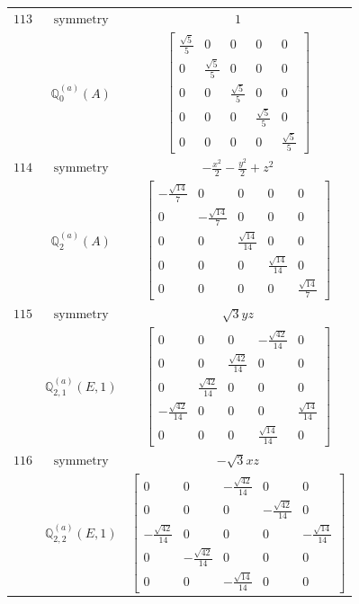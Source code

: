 \documentclass[fleqn,8pt,landscape]{jsarticle}
\begin{document}
\begin{longtable}{ccc}
$ 113 $ & $ \text{symmetry} $ & $ 1 $ \\
$  $ & $ \mathbb{Q}_{0}^{(a)}(A) $ & $ \begin{bmatrix} \frac{\sqrt{5}}{5} & 0 & 0 & 0 & 0 \\ 0 & \frac{\sqrt{5}}{5} & 0 & 0 & 0 \\ 0 & 0 & \frac{\sqrt{5}}{5} & 0 & 0 \\ 0 & 0 & 0 & \frac{\sqrt{5}}{5} & 0 \\ 0 & 0 & 0 & 0 & \frac{\sqrt{5}}{5} \end{bmatrix} $ \\ \hline
$ 114 $ & $ \text{symmetry} $ & $ - \frac{x^{2}}{2} - \frac{y^{2}}{2} + z^{2} $ \\
$  $ & $ \mathbb{Q}_{2}^{(a)}(A) $ & $ \begin{bmatrix} - \frac{\sqrt{14}}{7} & 0 & 0 & 0 & 0 \\ 0 & - \frac{\sqrt{14}}{7} & 0 & 0 & 0 \\ 0 & 0 & \frac{\sqrt{14}}{14} & 0 & 0 \\ 0 & 0 & 0 & \frac{\sqrt{14}}{14} & 0 \\ 0 & 0 & 0 & 0 & \frac{\sqrt{14}}{7} \end{bmatrix} $ \\ \hline
$ 115 $ & $ \text{symmetry} $ & $ \sqrt{3} y z $ \\
$  $ & $ \mathbb{Q}_{2,1}^{(a)}(E,1) $ & $ \begin{bmatrix} 0 & 0 & 0 & - \frac{\sqrt{42}}{14} & 0 \\ 0 & 0 & \frac{\sqrt{42}}{14} & 0 & 0 \\ 0 & \frac{\sqrt{42}}{14} & 0 & 0 & 0 \\ - \frac{\sqrt{42}}{14} & 0 & 0 & 0 & \frac{\sqrt{14}}{14} \\ 0 & 0 & 0 & \frac{\sqrt{14}}{14} & 0 \end{bmatrix} $ \\ \hline
$ 116 $ & $ \text{symmetry} $ & $ - \sqrt{3} x z $ \\
$  $ & $ \mathbb{Q}_{2,2}^{(a)}(E,1) $ & $ \begin{bmatrix} 0 & 0 & - \frac{\sqrt{42}}{14} & 0 & 0 \\ 0 & 0 & 0 & - \frac{\sqrt{42}}{14} & 0 \\ - \frac{\sqrt{42}}{14} & 0 & 0 & 0 & - \frac{\sqrt{14}}{14} \\ 0 & - \frac{\sqrt{42}}{14} & 0 & 0 & 0 \\ 0 & 0 & - \frac{\sqrt{14}}{14} & 0 & 0 \end{bmatrix} $ \\ \hline

\end{longtable}
\end{document}
